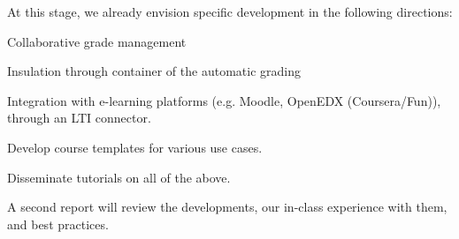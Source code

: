 \begin{task}[
  title={Teaching tools, infrastructure, and best practices},
  id=teaching-tools,
  lead=EP,
  PM=21, %
  wphases={0-36!.7},
  partners={UPSUD}
  ]
  At this stage, we already envision specific development in the
  following directions:
  \begin{compactitem}
  \item Collaborative grade management
  \item Insulation through container of the automatic grading
  \item Integration with e-learning platforms (e.g. Moodle, OpenEDX
    (Coursera/Fun)), through an LTI connector.
  \item Develop course templates for various use cases.
  \item Disseminate tutorials on all of the above.
  \end{compactitem}

  A second report  will review the
  developments, our in-class experience with them, and best practices.
\end{task}
